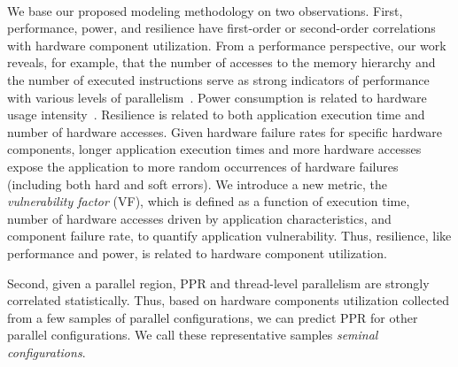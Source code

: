 \documentclass{article}  %
\begin{document}


\vspace{10pt}

  \\
We base our proposed modeling methodology on two observations.
First, performance, power, and resilience have first-order or
second-order correlations with hardware component utilization.
From a performance perspective, our work reveals, for example, that
the number of accesses to the memory hierarchy and the number of
executed instructions serve as strong indicators of performance with
various levels of 
parallelism~\cite{mpiopenmp_tpds13, mpiopenmp_ipdps10, dct_pmbs11, dct_iiswc12}. 
Power consumption is related to hardware usage 
intensity~\cite{leon:14:characterizing,mpiopenmp_tpds13, powermodel_sigmetrics03, powermodel_micro03}.
Resilience is related to both application execution time and number of 
hardware accesses. Given hardware failure rates for specific hardware
components, longer application execution times and more hardware accesses 
expose the application to more random occurrences of hardware failures 
(including both hard and soft errors). We introduce a new metric, the
\textit{vulnerability factor} (VF), which is defined as a function of 
execution time, number of hardware accesses driven by application characteristics,
and component failure rate,
to quantify application vulnerability. Thus, resilience,
like performance and power, is related to hardware component utilization.

 
Second, given a parallel region, PPR and thread-level parallelism are
strongly correlated  statistically. Thus, based on hardware components 
utilization collected from a few samples of parallel configurations, 
we can predict PPR for other parallel configurations. 
We call these representative samples \textit{seminal configurations}.
\end{document}
